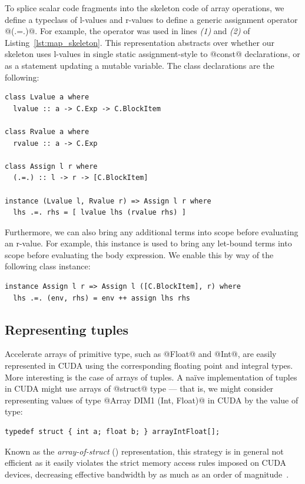 To splice scalar code fragments into the skeleton code of array operations, we
define a typeclass of l-values and r-values to define a generic assignment
operator @(.=.)@. For example, the operator was used in lines \emph{(1)}
and \emph{(2)} of Listing~\ref{lst:map_skeleton}. This representation abstracts
over whether our skeleton uses l-values in single static assignment-style to
@const@ declarations, or as a statement updating a mutable variable. The
class declarations are the following:
%
\begin{lstlisting}[style=haskell]
class Lvalue a where
  lvalue :: a -> C.Exp -> C.BlockItem

class Rvalue a where
  rvalue :: a -> C.Exp

class Assign l r where
  (.=.) :: l -> r -> [C.BlockItem]

instance (Lvalue l, Rvalue r) => Assign l r where
  lhs .=. rhs = [ lvalue lhs (rvalue rhs) ]
\end{lstlisting}

Furthermore, we can also bring any additional terms into scope before evaluating
an r-value. For example, this instance is used to bring any let-bound terms into
scope before evaluating the body expression. We enable this by way of the
following class instance:
%
\begin{lstlisting}[style=haskell]
instance Assign l r => Assign l ([C.BlockItem], r) where
  lhs .=. (env, rhs) = env ++ assign lhs rhs
\end{lstlisting}


\subsection{Representing tuples}
\label{sec:representing_tuples}

Accelerate arrays of primitive type, such as @Float@ and @Int@, are
easily represented in CUDA using the corresponding floating point and integral
types. More interesting is the case of arrays of tuples. A na\"ive
implementation of tuples in CUDA might use arrays of @struct@ type --- that
is, we might consider representing values of type @Array DIM1 (Int, Float)@
in CUDA by the value of type:
%
\begin{lstlisting}[style=cuda]
typedef struct { int a; float b; } arrayIntFloat[];
\end{lstlisting}
%
Known as the \emph{array-of-struct} (\AoS{})
representation, this strategy is in general not efficient as it easily violates
the strict memory access rules imposed on CUDA devices, decreasing effective
bandwidth by as much as an order of magnitude~\cite{NVIDIA:2012wf}.

